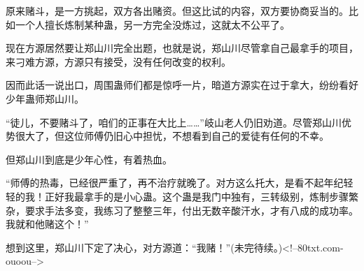 \begin{this_body}
原来赌斗，是一方挑起，双方各出赌资。但这比试的内容，双方要协商妥当的。比如一个人擅长炼制某种蛊，另一方完全没炼过，这就太不公平了。

现在方源居然要让郑山川完全出题，也就是说，郑山川尽管拿自己最拿手的项目，来刁难方源，方源只有接受，没有任何改变的权利。

因而此话一说出口，周围蛊师们都是惊呼一片，暗道方源实在过于拿大，纷纷看好少年蛊师郑山川。

“徒儿，不要赌斗了，咱们的正事在大比上……”岐山老人仍旧劝道。尽管郑山川优势很大了，但这位师傅仍旧心中担忧，不想看到自己的爱徒有任何的不幸。

但郑山川到底是少年心性，有着热血。

“师傅的热毒，已经很严重了，再不治疗就晚了。对方这么托大，是看不起年纪轻轻的我！正好我最拿手的是小心蛊。这个蛊是我门中独有，三转级别，炼制步骤繁杂，要求手法多变，我练习了整整三年，付出无数辛酸汗水，才有八成的成功率。我就和他赌这个！”

想到这里，郑山川下定了决心，对方源道：“我赌！”(未完待续。)<!--80txt.com-ouoou-->

\end{this_body}


